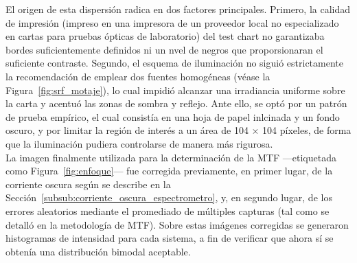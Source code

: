      El origen de esta dispersión radica en dos factores principales. Primero, la calidad de impresión (impreso en una impresora de un proveedor local no especializado en cartas para pruebas ópticas de laboratorio) del test chart no garantizaba bordes suficientemente definidos ni un nvel de negros que proporsionaran el suficiente contraste. Segundo, el esquema de iluminación no siguió estrictamente la recomendación de emplear dos fuentes homogéneas (véase la Figura~\ref{fig:srf_motaje}), lo cual impidió alcanzar una irradiancia uniforme sobre la carta y acentuó las zonas de sombra y reflejo. Ante ello, se optó por un patrón de prueba empírico, el cual consistía en una hoja de papel inlcinada y un fondo oscuro, y por limitar la región de interés a un área de 104 $\times$ 104 píxeles, de forma que la iluminación pudiera controlarse de manera más rigurosa.\\
      
      La imagen finalmente utilizada para la determinación de la MTF —etiquetada como Figura~\ref{fig:enfoque}— fue corregida previamente, en primer lugar, de la corriente oscura según se describe en la Sección~\ref{subsub:corriente_oscura_espectrometro}, y, en segundo lugar, de los errores aleatorios mediante el promediado de múltiples capturas (tal como se detalló en la metodología de MTF). Sobre estas imágenes corregidas se generaron histogramas de intensidad para cada sistema, a fin de verificar que ahora sí se obtenía una distribución bimodal aceptable.
      
